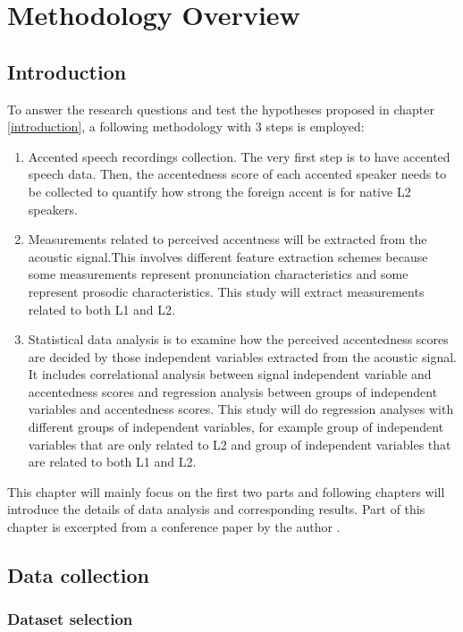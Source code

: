 \chapter{Methodology Overview}
\label{sec:methodology}
\section{Introduction}
To answer the research questions and test the hypotheses proposed in chapter \ref{introduction}, a following methodology with 3 steps is employed:
\begin{enumerate}
\item Accented speech recordings collection. The very first step is to have accented speech data. Then, the accentedness score of each accented speaker needs to be collected to quantify how strong the foreign accent is for native L2 speakers.
\item Measurements related to perceived accentness will be extracted from the acoustic signal.This involves different feature extraction schemes because some measurements represent pronunciation characteristics and some represent prosodic characteristics. This study will extract measurements related to both L1 and L2.
\item Statistical data analysis is to examine how the perceived accentedness scores are decided by those independent variables extracted from the acoustic signal. It includes correlational analysis between signal independent variable and accentedness scores and regression analysis between groups of independent variables and accentedness scores. This study will do regression analyses with different groups of independent variables, for example group of independent variables that are only related to L2 and group of independent variables that are related to both L1 and L2.
\end{enumerate}
This chapter will mainly focus on the first two parts and following chapters will introduce the details of data analysis and corresponding results. Part of this chapter is excerpted from a conference paper by the author \citep{tu2018investigating}.

\section{Data collection}

\subsection{Dataset selection}

